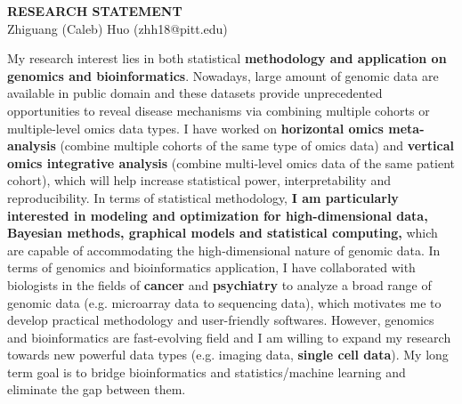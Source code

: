 \documentclass[a4paper, 10pt]{article}
\begin{document}
\thispagestyle{fancy}
\lhead{}
\rhead{}
\renewcommand{\headrulewidth}{0pt} 
\renewcommand{\footrulewidth}{0pt} 


\pagestyle{fancy}
\lhead{\textcolor{gray}{\it Zhiguang (Caleb) Huo}}


\begin{center}
{\LARGE \bf RESEARCH STATEMENT}\\
\vspace*{0.1cm}
{\normalsize Zhiguang (Caleb) Huo (zhh18@pitt.edu)}
\end{center}


My research interest lies in both statistical \textbf{methodology and application on genomics and bioinformatics}.
Nowadays, large amount of genomic data are available in public domain and 
these datasets provide unprecedented opportunities to reveal disease mechanisms via combining multiple cohorts or multiple-level omics data types.
I have worked on \textbf{horizontal omics meta-analysis} (combine multiple cohorts of the same type of omics data) and 
\textbf{vertical omics integrative analysis} (combine multi-level omics data of the same patient cohort),
which will help increase statistical power, interpretability and reproducibility.
In terms of statistical methodology,
\textbf{I am particularly interested in modeling and optimization for high-dimensional data, Bayesian methods, graphical models and statistical computing,}
which are capable of accommodating the high-dimensional nature of genomic data.
In terms of genomics and bioinformatics application,
I have collaborated with biologists in the fields of \textbf{cancer} and \textbf{psychiatry} to analyze a broad range of genomic data (e.g. microarray data to sequencing data),
which motivates me to develop practical methodology and user-friendly softwares.
However, genomics and bioinformatics are fast-evolving field and 
I am willing to expand my research towards new powerful data types (e.g. imaging data, \textbf{single cell data}).
My long term goal is to bridge bioinformatics and statistics/machine learning and eliminate the gap between them.
\end{document}
